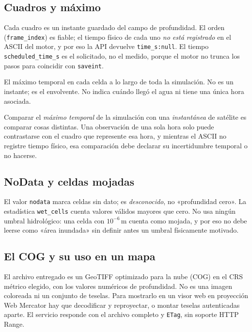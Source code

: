 \documentclass[11pt,a4paper]{article}
\begin{document}
\subsection{Cuadros y máximo}

\begin{description}[style=nextline]
  \item[Cuadros.] Cada cuadro es un instante guardado del campo de profundidad. El orden (\texttt{frame\_index}) es
        fiable; el tiempo físico de cada uno \emph{no está registrado} en el ASCII del motor, y por eso la API
        devuelve \texttt{time\_s:null}. El tiempo \texttt{scheduled\_time\_s} es el solicitado, no el medido,
        porque el motor no trunca los pasos para coincidir con \texttt{saveint}.
  \item[Máximo.] El máximo temporal en cada celda a lo largo de toda la simulación. No es un instante; es el
        envolvente. No indica cuándo llegó el agua ni tiene una única hora asociada.
\end{description}

\begin{cuidado}
Comparar el \emph{máximo temporal} de la simulación con una \emph{instantánea} de satélite es comparar cosas
distintas. Una observación de una sola hora solo puede contrastarse con el cuadro que represente esa hora, y
mientras el ASCII no registre tiempo físico, esa comparación debe declarar su incertidumbre temporal o no
hacerse.
\end{cuidado}

\subsection{NoData y celdas mojadas}

El valor \texttt{nodata} marca celdas sin dato; es \emph{desconocido}, no «profundidad cero». La estadística
\texttt{wet\_cells} cuenta valores válidos mayores que cero. No usa ningún umbral hidrológico: una celda con
$10^{-6}$\,m cuenta como mojada, y por eso no debe leerse como «área inundada» sin definir antes un umbral
físicamente motivado.

\subsection{El COG y su uso en un mapa}

El archivo entregado es un GeoTIFF optimizado para la nube (COG) en el CRS métrico elegido, con los valores
numéricos de profundidad. No es una imagen coloreada ni un conjunto de teselas. Para mostrarlo en un visor web
en proyección Web Mercator hay que decodificar y reproyectar, o montar teselas autenticadas aparte. El
servicio responde con el archivo completo y \texttt{ETag}, sin soporte HTTP Range.
\end{document}

